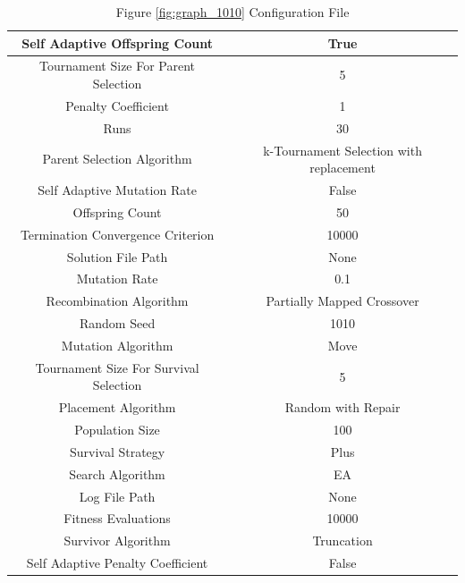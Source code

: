 \documentclass{standalone}
\begin{document}
\begin{table}[!htb]
	\centering
	\caption{Figure \ref{fig:graph_1010} Configuration File}
	\label{tab:graph_1010}
	\begin{tabular}{| c | c |}
		\hline
		Self Adaptive Offspring Count		& True		 \\
		\hline
		Tournament Size For Parent Selection		& 5		 \\
		\hline
		Penalty Coefficient		& 1		 \\
		\hline
		Runs		& 30		 \\
		\hline
		Parent Selection Algorithm		& k-Tournament Selection with replacement		 \\
		\hline
		Self Adaptive Mutation Rate		& False		 \\
		\hline
		Offspring Count		& 50		 \\
		\hline
		Termination Convergence Criterion		& 10000		 \\
		\hline
		Solution File Path		& None		 \\
		\hline
		Mutation Rate		& 0.1		 \\
		\hline
		Recombination Algorithm		& Partially Mapped Crossover		 \\
		\hline
		Random Seed		& 1010		 \\
		\hline
		Mutation Algorithm		& Move		 \\
		\hline
		Tournament Size For Survival Selection		& 5		 \\
		\hline
		Placement Algorithm		& Random with Repair		 \\
		\hline
		Population Size		& 100		 \\
		\hline
		Survival Strategy		& Plus		 \\
		\hline
		Search Algorithm		& EA		 \\
		\hline
		Log File Path		& None		 \\
		\hline
		Fitness Evaluations		& 10000		 \\
		\hline
		Survivor Algorithm		& Truncation		 \\
		\hline
		Self Adaptive Penalty Coefficient		& False		 \\
		\hline
	\end{tabular}
\end{table}
\end{document}
